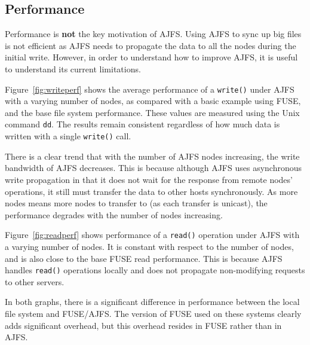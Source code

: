 \subsection{Performance}

Performance is \textbf{not} the key motivation of AJFS. Using AJFS to sync up
big files is not efficient as AJFS needs to propagate the data to
all the nodes during the initial write. However, in order to understand how to
improve AJFS, it is useful to understand its current limitations.

Figure~\ref{fig:writeperf} shows the average performance of a \texttt{write()}
under AJFS with a varying number of nodes, as compared with a basic example
using FUSE, and the base file system performance. These values are measured
using the Unix command \texttt{dd}. The results remain consistent regardless of
how much data is written with a single \texttt{write()} call.

There is a clear trend that with the number of AJFS nodes increasing, the write
bandwidth of AJFS decreases. This is because although AJFS uses asynchronous
write propagation in that it does not wait for the response from remote nodes'
operations, it still must transfer the data to other hosts synchronously.
As more nodes means more nodes to transfer to (as each transfer is unicast), the
performance degrades with the number of nodes increasing. 

Figure~\ref{fig:readperf} shows performance of a \texttt{read()} operation under
AJFS with a varying number of nodes. It is constant with respect to the number
of nodes, and is also close to the base FUSE read performance.
This is because AJFS handles \texttt{read()} operations locally and does not
propagate non-modifying requests to other servers.

In both graphs, there is a significant difference in performance between the
local file system and FUSE/AJFS. The version of FUSE used on these systems
clearly adds significant overhead, but this overhead resides in FUSE rather than
in AJFS.


